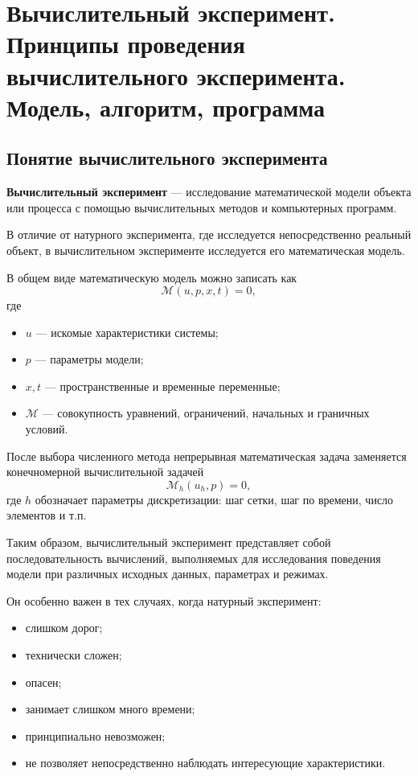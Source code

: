 \section{Вычислительный эксперимент. Принципы проведения вычислительного эксперимента. Модель, алгоритм, программа}

\subsection{Понятие вычислительного эксперимента}

\textbf{Вычислительный эксперимент} --- исследование математической модели объекта или процесса с помощью вычислительных методов и компьютерных программ.

В отличие от натурного эксперимента, где исследуется непосредственно реальный объект, в вычислительном эксперименте исследуется его математическая модель.

В общем виде математическую модель можно записать как
\[
\mathcal{M}(u,p,x,t)=0,
\]
где
\begin{itemize}
	\item $u$ --- искомые характеристики системы;
	\item $p$ --- параметры модели;
	\item $x,t$ --- пространственные и временные переменные;
	\item $\mathcal{M}$ --- совокупность уравнений, ограничений, начальных и граничных условий.
\end{itemize}

После выбора численного метода непрерывная математическая задача заменяется конечномерной вычислительной задачей
\[
\mathcal{M}_h(u_h,p)=0,
\]
где $h$ обозначает параметры дискретизации: шаг сетки, шаг по времени, число элементов и т.п.

Таким образом, вычислительный эксперимент представляет собой последовательность вычислений, выполняемых для исследования поведения модели при различных исходных данных, параметрах и режимах.

Он особенно важен в тех случаях, когда натурный эксперимент:
\begin{itemize}
	\item слишком дорог;
	\item технически сложен;
	\item опасен;
	\item занимает слишком много времени;
	\item принципиально невозможен;
	\item не позволяет непосредственно наблюдать интересующие характеристики.
\end{itemize}


